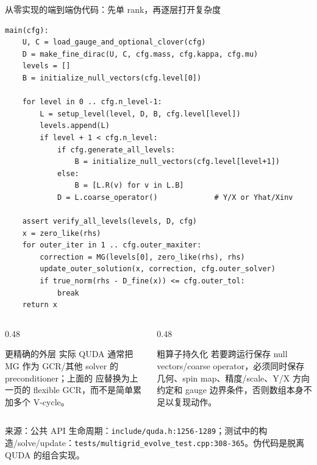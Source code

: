 \documentclass[UTF8,aspectratio=169,11pt]{ctexbeamer}
\newcommand{\source}[1]{\vspace{0.05em}\par{\raggedright\scriptsize\color{muted}来源：#1\par}}
\newcommand{\codepath}[1]{\nolinkurl{#1}}
\begin{document}
\begin{frame}[fragile,t]{从零实现的端到端伪代码：先单 rank，再逐层打开复杂度}
  \begin{lstlisting}[firstnumber=1]
main(cfg):
    U, C = load_gauge_and_optional_clover(cfg)
    D = make_fine_dirac(U, C, cfg.mass, cfg.kappa, cfg.mu)
    levels = []
    B = initialize_null_vectors(cfg.level[0])

    for level in 0 .. cfg.n_level-1:
        L = setup_level(level, D, B, cfg.level[level])
        levels.append(L)
        if level + 1 < cfg.n_level:
            if cfg.generate_all_levels:
                B = initialize_null_vectors(cfg.level[level+1])
            else:
                B = [L.R(v) for v in L.B]
            D = L.coarse_operator()             # Y/X or Yhat/Xinv

    assert verify_all_levels(levels, D, cfg)
    x = zero_like(rhs)
    for outer_iter in 1 .. cfg.outer_maxiter:
        correction = MG(levels[0], zero_like(rhs), rhs)
        update_outer_solution(x, correction, cfg.outer_solver)
        if true_norm(rhs - D_fine(x)) <= cfg.outer_tol:
            break
    return x
  \end{lstlisting}
  \vspace{0.05cm}
  \begin{columns}[T,totalwidth=\textwidth]
    \begin{column}{0.48\textwidth}
      \begin{block}{更精确的外层}
        实际 QUDA 通常把 MG 作为 GCR/其他 solver 的 preconditioner；上面的 \texttt{} 应替换为上一页的 flexible GCR，而不是简单累加多个 V-cycle。
      \end{block}
    \end{column}
    \begin{column}{0.48\textwidth}
      \begin{alertblock}{粗算子持久化}
        若要跨运行保存 null vectors/coarse operator，必须同时保存几何、spin map、精度/scale、Y/X 方向约定和 gauge 边界条件，否则数组本身不足以复现动作。
      \end{alertblock}
    \end{column}
  \end{columns}
  \source{公共 API 生命周期：\codepath{include/quda.h:1256-1289}；测试中的构造/solve/update：\codepath{tests/multigrid_evolve_test.cpp:308-365}。伪代码是脱离 QUDA 的组合实现。}
\end{frame}
\end{document}
